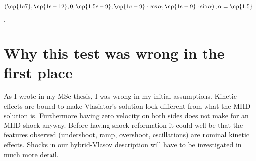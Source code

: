 \documentclass[a4paper,10pt]{scrartcl}
\begin{document}
$$
\left(\np{1e7}, \np{1e-12}, 0, \np{1.5e-9}, \np{1e-9}\cdot\cos \alpha, \np{1e-9}\cdot\sin \alpha\right), \alpha = \np{1.5}
$$.


\section{Why this test was wrong in the first place}
As I wrote in my MSc thesis, I was wrong in my initial assumptions. Kinetic effects are bound to make Vlasiator's solution look different from what the MHD solution is. Furthermore having zero velocity on both sides does not make for an MHD shock anyway. Before having shock reformation it could well be that the features observed (undershoot, ramp, overshoot, oscillations) are nominal kinetic effects. Shocks in our hybrid-Vlasov description will have to be investigated in much more detail.
\end{document}
